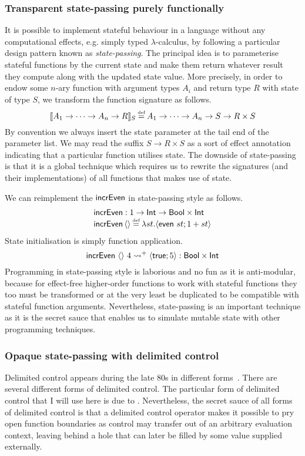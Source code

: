 \documentclass[12pt,phd,lfcs,twoside,openright,logo,leftchapter,normalheadings]{infthesis}
\theoremstyle{plain}
\theoremstyle{definition}
\begin{document}
\subsubsection{Transparent state-passing purely functionally}
It is possible to implement stateful behaviour in a language without
any computational effects, e.g. simply typed $\lambda$-calculus, by
following a particular design pattern known as
\emph{state-passing}. The principal idea is to parameterise stateful
functions by the current state and make them return whatever result
they compute along with the updated state value. More precisely, in
order to endow some $n$-ary function with argument types $A_i$ and
return type $R$ with state of type $S$, we transform the function
signature as follows.
%
\[
    \sembr{A_1 \to \cdots \to A_n \to R}_S
  \defas A_1 \to \cdots \to A_n \to S \to R \times S
\]
%
By convention we always insert the state parameter at the tail end of
the parameter list. We may read the suffix $S \to R \times S$ as a
sort of effect annotation indicating that a particular function
utilises state. The downside of state-passing is that it is a global
technique which requires us to rewrite the signatures (and their
implementations) of all functions that makes use of state.

We can reimplement the $\mathsf{incrEven}$ in state-passing style as follows.
%
\[
  \bl
    \incrEven : \UnitType \to \Int \to \Bool \times \Int\\
    \incrEven\,\Unit \defas \lambda st. \Record{\even~st; 1 + st}
  \el
\]
%
State initialisation is simply function application.
%
\[
  \mathsf{incrEven}~\langle  \rangle~4 \leadsto^+ \langle \mathsf{true};5 \rangle : \mathsf{Bool} \times \mathsf{Int}
\]
%
Programming in state-passing style is laborious and no fun as it is
anti-modular, because for effect-free higher-order functions to work
with stateful functions they too must be transformed or at the very
least be duplicated to be compatible with stateful function arguments.
%
Nevertheless, state-passing is an important technique as it is the
secret sauce that enables us to simulate mutable state with other
programming techniques.

\subsubsection{Opaque state-passing with delimited control}
%
Delimited control appears during the late 80s in different
forms~\cite{SitaramF90,DanvyF89}.
%
There are several different forms of delimited control.  The
particular form of delimited control that I will use here is due to
\citet{DanvyF89}.
%
Nevertheless, the secret sauce of all forms of delimited control is
that a delimited control operator makes it possible to pry open
function boundaries as control may transfer out of an arbitrary
evaluation context, leaving behind a hole that can later be filled by
some value supplied externally.
\end{document}
